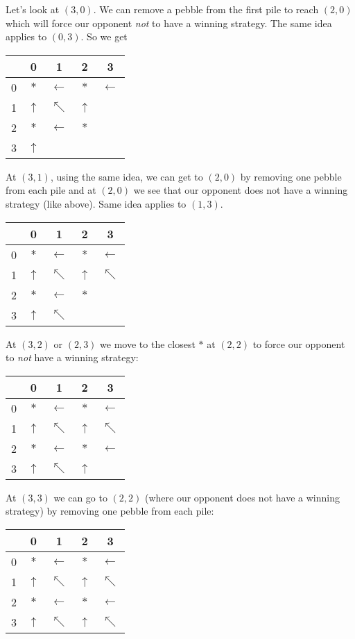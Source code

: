 Let's look at $(3,0)$.
We can remove a pebble from the first pile to reach $(2,0)$
which will force our opponent {\it not} to have a winning strategy.
The same idea applies to $(0,3)$.
So we get
\begin{longtable}{|c|cccc|} \hline
  & 0   & 1 & 2 & 3\\ \hline
0 & $*$ & $\leftarrow$  &  $*$ & $\leftarrow$ \\
1 & $\uparrow$    & $\nwarrow$&  $\uparrow$ & \\
2 & $*$ & $\leftarrow$  &  $*$ & \\
3 & $\uparrow$    &               &      & \\ \hline
\end{longtable}

At $(3,1)$, using the same idea, we can get to $(2,0)$ by
removing one pebble from each pile and at $(2,0)$ we see that
our opponent does not have a winning strategy (like above).
Same idea applies to $(1,3)$.
\newpage
\begin{longtable}{|c|cccc|} \hline
  & 0   & 1 & 2 & 3\\ \hline
0 & $*$ & $\leftarrow$  &  $*$ & $\leftarrow$ \\
1 & $\uparrow$    & $\nwarrow$&  $\uparrow$ & $\nwarrow$ \\
2 & $*$ & $\leftarrow$  &  $*$ & \\
3 & $\uparrow$    & $\nwarrow$              &      & \\ \hline
\end{longtable}

At $(3,2)$ or $(2,3)$ we move to the closest $*$ at $(2,2)$ 
to force our opponent to {\it not} have a winning strategy:
\begin{longtable}{|c|cccc|} \hline
  & 0   & 1 & 2 & 3\\ \hline
0 & $*$ & $\leftarrow$  &  $*$ & $\leftarrow$ \\
1 & $\uparrow$    & $\nwarrow$&  $\uparrow$ & $\nwarrow$ \\
2 & $*$ & $\leftarrow$  &  $*$ & $\leftarrow$ \\
3 & $\uparrow$    & $\nwarrow$ & $\uparrow$ & \\ \hline
\end{longtable}

At $(3,3)$ we can go to $(2,2)$ (where our opponent does not have
a winning strategy) by removing one pebble from each pile:
\begin{longtable}{|c|cccc|} \hline
  & 0   & 1 & 2 & 3\\ \hline
0 & $*$ & $\leftarrow$  &  $*$ & $\leftarrow$ \\
1 & $\uparrow$    & $\nwarrow$&  $\uparrow$ & $\nwarrow$ \\
2 & $*$ & $\leftarrow$  &  $*$ & $\leftarrow$ \\
3 & $\uparrow$    & $\nwarrow$ & $\uparrow$ & $\nwarrow$ \\ \hline
\end{longtable}

